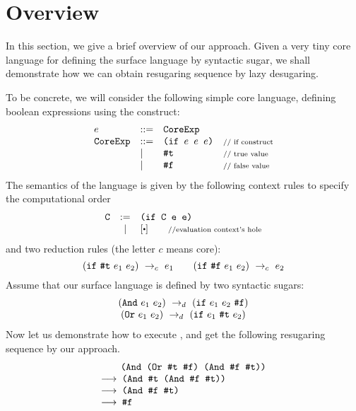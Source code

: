 \section{Overview}
\label{sec2}


In this section, we give a brief overview of our approach. Given a very tiny core language for defining the surface language by syntactic sugar, we shall demonstrate how we can obtain resugaring sequence by lazy desugaring.


To be concrete, we will consider the following simple core language, defining boolean expressions using the  construct:
\[
\begin{array}{lllll}
e &::=& \mbox{\tt CoreExp}\\
\mbox{\tt CoreExp} &::=& \texttt{(if~$e$~$e$~$e$)} &\mbox{{\scriptsize // if construct}}\\
& |& \mbox{\tt \#t}  & \mbox{{\scriptsize // true value}}\\
& |& \mbox{\tt \#f} & \mbox{{\scriptsize // false value}}
\end{array}
\]
The semantics of the language is given by the following context rules to specify the computational order
\[
\begin{array}{lcl}
\m{C} &:=& \Code{(if C e e)}\\
&|&[\bigcdot] \qquad \note{//evaluation context's hole}\\
\end{array}
\]
and two reduction rules (the letter $c$ means core):
\[
\centering
 \redc{(\m{if}~\m{\true}~e_1~e_2)}{e_1}  \qquad \redc{(\m{if}~\m{\false}~e_1~e_2)}{e_2}
\]
Assume that our surface language is defined by two syntactic sugars:
\[
\begin{array}{c}
(\mbox{\tt And}~e_1~e_2) ~\rightarrow_d~ (\mbox{\tt if}~e_1~e_2~\mbox{\tt \#f})\\
(\mbox{\tt Or}~e_1~e_2) ~\rightarrow_d~ (\mbox{\tt if}~e_1~\mbox{\tt \#t}~e_2)
\end{array}
\]
Now let us demonstrate how to execute , and get the following resugaring sequence by our approach.
\[
    \begin{array}{l}
        \qquad\Code{(And (Or \true~\false) (And \false~\true))}\\
        \OneStep{\Code{ (And \true~(And \false~\true))}}\\
        \OneStep{\Code{ (And \false~\true)}}\\
        \OneStep{\Code{ \false}}\\
    \end{array}
\]


